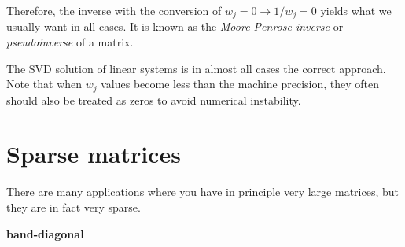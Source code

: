Therefore, the inverse with the conversion of $w_j = 0\rightarrow
1/w_j = 0$ yields what we usually want in all cases. It is known as
the {\it Moore-Penrose inverse} or {\it pseudoinverse} of a matrix. 

The SVD solution of linear systems is in almost all cases the correct
approach. Note that when $w_j$ values become less than the machine
precision, they often should also be treated as zeros to avoid
numerical instability.

\section{Sparse matrices}

There are many applications where you have in principle very large
matrices, but they are in fact very sparse.  

{\bf band-diagonal}
